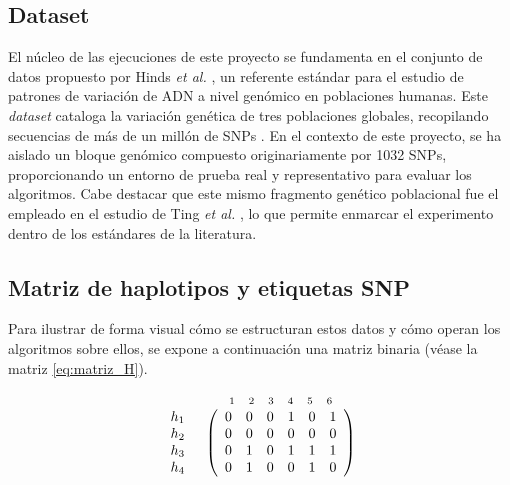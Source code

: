 \subsection{Dataset}
El núcleo de las ejecuciones de este proyecto se fundamenta en el conjunto de datos propuesto por Hinds \textit{et al.} \cite{hinds2005whole}, un referente estándar para el estudio de patrones de variación de ADN a nivel genómico en poblaciones humanas. Este \textit{dataset} cataloga la variación genética de tres poblaciones globales, recopilando secuencias de más de un millón de SNPs \cite{bafna2003haplotypes}. En el contexto de este proyecto, se ha aislado un bloque genómico compuesto originariamente por 1032 SNPs, proporcionando un entorno de prueba real y representativo para evaluar los algoritmos. Cabe destacar que este mismo fragmento genético poblacional fue el empleado en el estudio de Ting \textit{et al.} \cite{ting2010multi}, lo que permite enmarcar el experimento dentro de los estándares de la literatura. 

\subsection{Matriz de haplotipos y etiquetas SNP}
Para ilustrar de forma visual cómo se estructuran estos datos y cómo operan los algoritmos sobre ellos, se expone a continuación una matriz binaria (véase la matriz \ref{eq:matriz_H}). 

\begin{equation}\label{eq:matriz_H}
\begin{array}{cc}
 & \begin{array}{cccccc}
 \text{\scriptsize 1} & \text{\scriptsize 2} & \text{\scriptsize 3} & \text{\scriptsize 4} & \text{\scriptsize 5} & \text{\scriptsize 6}
 \end{array} \\
 \begin{array}{c} h_1 \\ h_2 \\ h_3 \\ h_4 \end{array} &
 \left(\begin{array}{cccccc}
 0 & 0 & 0 & 1 & 0 & 1 \\
 0 & 0 & 0 & 0 & 0 & 0 \\
 0 & 1 & 0 & 1 & 1 & 1 \\
 0 & 1 & 0 & 0 & 1 & 0 
 \end{array}\right)
\end{array}
\end{equation}

